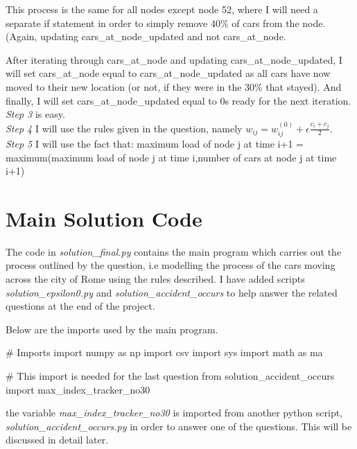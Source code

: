 \documentclass[paper=a4, fontsize=12pt]{scrartcl} %
\numberwithin{equation}{section}       %
\numberwithin{figure}{section}         %
\numberwithin{table}{section}          %
\begin{document}
This process is the same for all nodes except node 52, where I will need a separate if statement in order to simply remove 40\% of cars from the node. (Again, updating cars\_at\_node\_updated and not cars\_at\_node.

After iterating through cars\_at\_node and updating cars\_at\_node\_updated, I will set cars\_at\_node equal to cars\_at\_node\_updated as all cars have now moved to their new location (or not, if they were in the 30\% that stayed). And finally, I will set cars\_at\_node\_updated equal to 0s ready for the next iteration. \\

\textit{Step 3} is easy. \\

\textit{Step 4} I will use the rules given in the question, namely $w_{ij} = w_{ij}^{(0)} + \epsilon \frac{c_{i} + c_{j}}{2}$. \\

\textit{Step 5} I will use the fact that: maximum load of node j at time i+1 = maximum(maximum load of node j at time i,number of cars at node j at time i+1)


\section{Main Solution Code}

The code in \textit{solution\_final.py} contains the main program which carries out the process outlined by the question, i.e modelling the process of the cars moving across the city of Rome using the rules described. I have added scripts \textit{solution\_epsilon0.py} and \textit{solution\_accident\_occurs} to help answer the related questions at the end of the project.
\newline

Below are the imports used by the main program.

\begin{python}
# Imports
import numpy as np
import csv
import sys
import math as ma

# This import is needed for the last question
from solution_accident_occurs import max_index_tracker_no30
\end{python}

the variable \textit{max\_index\_tracker\_no30} is imported from another python script, 
\newline
\textit{solution\_accident\_occurs.py} in order to answer one of the questions. This will be discussed in detail later.
\leavevmode
\newline
\end{document}

